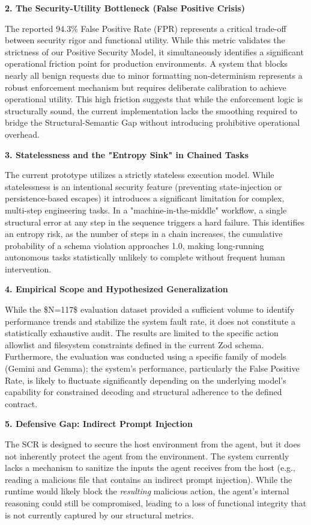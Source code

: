 \documentclass[conference]{IEEEtran}
\begin{document}
\textbf{2. The Security-Utility Bottleneck (False Positive Crisis)}

The reported 94.3\% False Positive Rate (FPR) represents a critical trade-off between security rigor and functional utility. While this metric validates the strictness of our Positive Security Model, it simultaneously identifies a significant operational friction point for production environments. A system that blocks nearly all benign requests due to minor formatting non-determinism represents a robust enforcement mechanism but requires deliberate calibration to achieve operational utility. This high friction suggests that while the enforcement logic is structurally sound, the current implementation lacks the smoothing required to bridge the Structural-Semantic Gap without introducing prohibitive operational overhead.

\textbf{3. Statelessness and the "Entropy Sink" in Chained Tasks}

The current prototype utilizes a strictly stateless execution model. While statelessness is an intentional security feature (preventing state-injection or persistence-based escapes) it introduces a significant limitation for complex, multi-step engineering tasks. In a "machine-in-the-middle" workflow, a single structural error at any step in the sequence triggers a hard failure. This identifies an entropy risk, as the number of steps in a chain increases, the cumulative probability of a schema violation approaches 1.0, making long-running autonomous tasks statistically unlikely to complete without frequent human intervention.

\textbf{4. Empirical Scope and Hypothesized Generalization}

While the \$N=117\$ evaluation dataset provided a sufficient volume to identify performance trends and stabilize the system fault rate, it does not constitute a statistically exhaustive audit. The results are limited to the specific action allowlist and filesystem constraints defined in the current Zod schema. Furthermore, the evaluation was conducted using a specific family of models (Gemini and Gemma); the system's performance, particularly the False Positive Rate, is likely to fluctuate significantly depending on the underlying model's capability for constrained decoding and structural adherence to the defined contract.

\textbf{5. Defensive Gap: Indirect Prompt Injection}

The SCR is designed to secure the host environment from the agent, but it does not inherently protect the agent from the environment. The system currently lacks a mechanism to sanitize the inputs the agent receives from the host (e.g., reading a malicious file that contains an indirect prompt injection). While the runtime would likely block the \textit{resulting} malicious action, the agent’s internal reasoning could still be compromised, leading to a loss of functional integrity that is not currently captured by our structural metrics.
\end{document}
